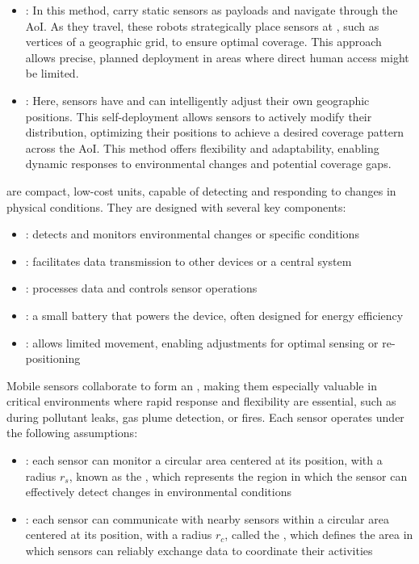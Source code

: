 \documentclass[a4paper, 12pt]{report}
\begin{document}
    \begin{itemize}
        \item {}: In this method,  carry static sensors as payloads and navigate through the AoI. As they travel, these robots strategically place sensors at , such as vertices of a geographic grid, to ensure optimal coverage. This approach allows precise, planned deployment in areas where direct human access might be limited.
        \item {}: Here, sensors have  and can intelligently adjust their own geographic positions. This self-deployment allows sensors to actively modify their distribution, optimizing their positions to achieve a desired coverage pattern across the AoI. This method offers flexibility and adaptability, enabling dynamic responses to environmental changes and potential coverage gaps.
    \end{itemize}

     are compact, low-cost units, capable of detecting and responding to changes in physical conditions. They are designed with several key components:

    \begin{itemize}
        \item {}: detects and monitors environmental changes or specific conditions
        \item {}: facilitates data transmission to other devices or a central system
        \item {}: processes data and controls sensor operations
        \item {}: a small battery that powers the device, often designed for energy efficiency
        \item {}: allows limited movement, enabling adjustments for optimal sensing or re-positioning
    \end{itemize}

    Mobile sensors collaborate to form an , making them especially valuable in critical environments where rapid response and flexibility are essential, such as during pollutant leaks, gas plume detection, or fires. Each sensor operates under the following assumptions:

    \begin{itemize}
        \item {}: each sensor can monitor a circular area centered at its position, with a radius $r_s$, known as the , which represents the region in which the sensor can effectively detect changes in environmental conditions
        \item {}: each sensor can communicate with nearby sensors within a circular area centered at its position, with a radius $r_c$, called the , which defines the area in which sensors can reliably exchange data to coordinate their activities
    \end{itemize}
\end{document}
